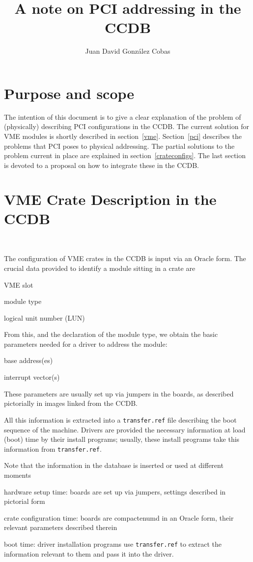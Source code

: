 \documentclass[a4paper]{article}
\title{A note on PCI addressing in the CCDB}
\author{Juan David Gonz\'alez Cobas}
\newcommand\fname[1]{\texttt{#1}}
\begin{document}
\maketitle

\section{Purpose and scope}

The intention of this document is to give a clear explanation of the
problem of (physically) describing PCI configurations in the CCDB.
The current solution for VME modules is shortly described in
section~\ref{vme}. Section~\ref{pci} describes the problems that PCI
poses to physical addressing. The partial solutions to the problem
current in place are explained in section~\ref{crateconfigs}.
The last section is devoted to a proposal on how to integrate these in
the CCDB.


\section{VME Crate Description in the CCDB}\
\label{vme}

The configuration of VME crates in the CCDB is input via an Oracle
form. The crucial data provided to identify a module sitting in a crate
are
\begin{compactitem}
\item VME slot
\item module type
\item logical unit number (LUN)
\end{compactitem}
From this, and the declaration of the module type, we obtain the basic
parameters needed for a driver to address the module:
\begin{compactitem}
\item base address(es)
\item interrupt vector(s)
\end{compactitem}
These parameters are usually set up via jumpers in the boards, as
described pictorially in images linked from the CCDB.

All this information is extracted into a \fname{transfer.ref} file
describing the boot sequence of the machine. Drivers are provided the
necessary information at load (boot) time by their install programs;
usually, these install programs take this information from
\fname{transfer.ref}.

Note that the information in the database is inserted or used at
different moments
\begin{compactitem}
\item hardware setup time: boards are set up via jumpers, settings
described in pictorial form
\item crate configuration time: boards are compactenumd in an Oracle form,
their relevant parameters described therein
\item boot time: driver installation programs use \fname{transfer.ref}
to extract the information relevant to them and pass it into the driver.
\end{compactitem}
\end{document}
